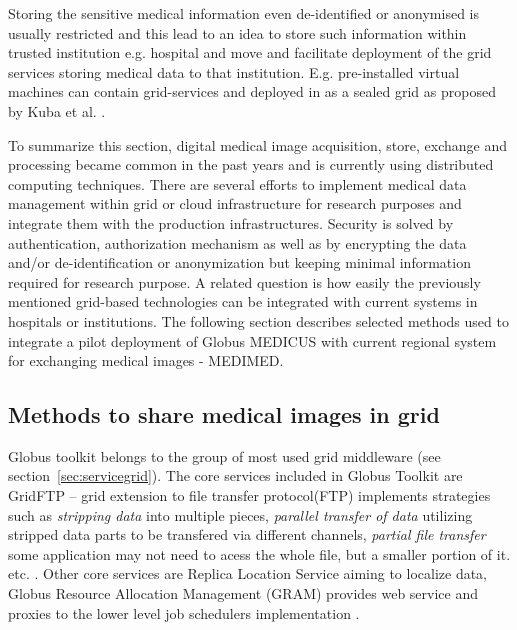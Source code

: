 Storing the sensitive medical information even de-identified or anonymised is usually restricted and this lead to an idea to store such information within trusted institution e.g. hospital and move and facilitate deployment of the grid services storing medical data to that institution. E.g. pre-installed virtual machines can contain grid-services and deployed in as a sealed grid as proposed by Kuba et al. \cite{Kuba2007a}.



To summarize this section, digital medical image acquisition, store, exchange and processing became common in the past years and is currently using distributed computing techniques. There are several efforts to implement medical data management within grid or cloud infrastructure for research purposes and integrate them with the production infrastructures. Security is solved by authentication, authorization mechanism as well as by encrypting the data and/or de-identification or anonymization but keeping minimal information required for research purpose. A related question is  how easily the previously mentioned grid-based technologies can be integrated with current systems in hospitals or institutions. The following section describes selected methods used to integrate a pilot deployment of Globus MEDICUS with current regional system for exchanging medical images - MEDIMED.

\subsection{Methods to share medical images in grid}
\label{sec:methodsimages}

Globus toolkit belongs to the group of most used grid middleware (see section~\ref{sec:servicegrid}). The core services included in Globus Toolkit are GridFTP -- grid extension to file transfer protocol(FTP) implements strategies such as \emph{stripping data} into multiple pieces, \emph{parallel transfer of data} utilizing stripped data parts to be transfered via different channels, \emph{partial file transfer} some application may not need to acess the whole file, but a smaller portion of it. etc. \cite{Foster2006, Allcock2005}. Other core services are Replica Location Service aiming to localize data, Globus Resource Allocation Management (GRAM) provides web service and proxies to the lower level job schedulers implementation \cite{Foster2006}.


